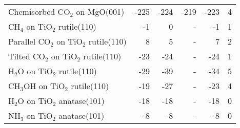 \begin{table}
\begin{adjustbox}{center,max width=1\textwidth}
\begin{tabular}{lrrrrr}
Chemisorbed CO$_2$ on MgO(001) & -225 & -224 & -219 & -223 & 4 \\
CH$_4$ on TiO$_2$ rutile(110) & -1 & 0 & - & -1 & 1 \\
Parallel CO$_2$ on TiO$_2$ rutile(110) & 8 & 5 & - & 7 & 2 \\
Tilted CO$_2$ on TiO$_2$ rutile(110) & -23 & -24 & - & -24 & 1 \\
H$_2$O on TiO$_2$ rutile(110) & -29 & -39 & - & -34 & 5 \\
CH$_3$OH on TiO$_2$ rutile(110) & -19 & -27 & - & -23 & 4 \\
H$_2$O on TiO$_2$ anatase(101) & -18 & -18 & - & -18 & 0 \\
NH$_3$ on TiO$_2$ anatase(101) & -8 & -8 & - & -8 & 0 \\
\bottomrule
\end{tabular}
\end{adjustbox}
\end{table}